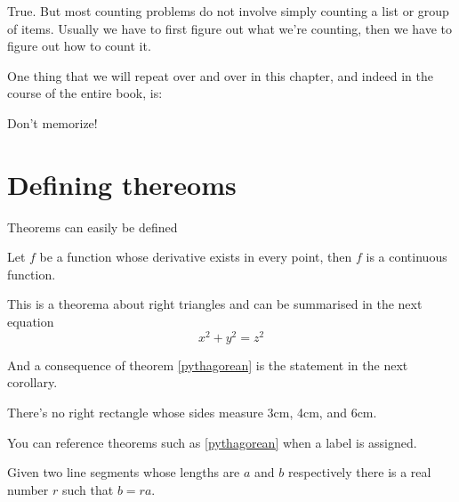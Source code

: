 True. But most counting problems do not involve simply counting a list or group of items. Usually we have to first figure out what we’re counting, then we have to figure out how to count it.

One thing that we will repeat over and over in this chapter, and indeed in the course of the entire book, is:

\begin{claim}
Don’t memorize!
\end{claim}



\section{Defining thereoms}
Theorems can easily be defined
\newtheorem{prop}{Proposition}[section]
\begin{theorem}
Let $f$ be a function whose derivative exists in every point, then $f$ is 
a continuous function.
\end{theorem}

\begin{theorem}
\label{pythagorean}
This is a theorema about right triangles and can be summarised in the next 
equation 
\[ x^2 + y^2 = z^2 \]
\end{theorem}

And a consequence of theorem \ref{pythagorean} is the statement in the next 
corollary.

\begin{corollary}
There's no right rectangle whose sides measure 3cm, 4cm, and 6cm.
\end{corollary}

You can reference theorems such as \ref{pythagorean} when a label is assigned.

\begin{lemma}
Given two line segments whose lengths are $a$ and $b$ respectively there is a 
real number $r$ such that $b=ra$.
\end{lemma}

\section{}




\section{}

\section{}



